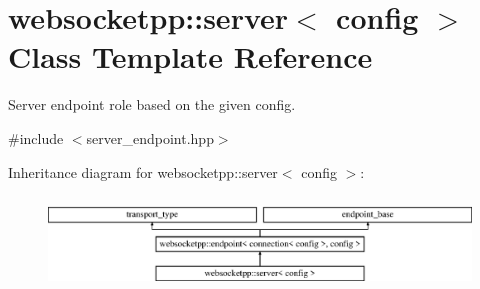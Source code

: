 \hypertarget{classwebsocketpp_1_1server}{}\section{websocketpp\+:\+:server$<$ config $>$ Class Template Reference}
\label{classwebsocketpp_1_1server}


Server endpoint role based on the given config.  




{\ttfamily \#include $<$server\+\_\+endpoint.\+hpp$>$}

Inheritance diagram for websocketpp\+:\+:server$<$ config $>$\+:\begin{figure}[H]
\begin{center}
\leavevmode
\includegraphics[height=2.500000cm]{classwebsocketpp_1_1server}
\end{center}
\end{figure}
